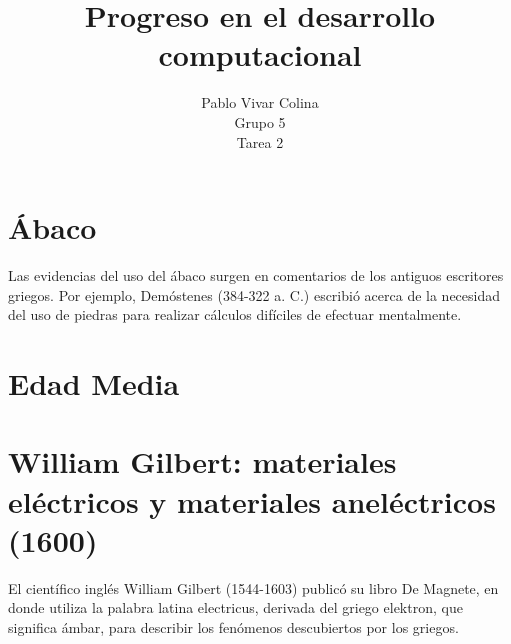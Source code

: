 \documentclass{article}
\title{Progreso en el desarrollo computacional}
\author{Pablo Vivar Colina\\
Grupo 5\\
Tarea 2
}
\begin{document}
\maketitle

\section{Ábaco}

Las evidencias del uso del ábaco surgen en comentarios de los antiguos escritores griegos. Por ejemplo, Demóstenes (384-322 a. C.) escribió acerca de la necesidad del uso de piedras para realizar cálculos difíciles de efectuar mentalmente. \citep{Abaco}\\


\section{Edad Media}






\section{William Gilbert: materiales eléctricos y materiales aneléctricos (1600)}

El científico inglés William Gilbert (1544-1603) publicó su libro De Magnete, en donde utiliza la palabra latina electricus, derivada del griego elektron, que significa ámbar, para describir los fenómenos descubiertos por los griegos. \citep{HDE}\\

\end{document}
